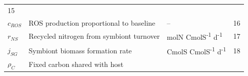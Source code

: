 \documentclass[]{elsarticle} %
\begin{document}
\begin{longtable}[c]{@{}llll@{}}
\begin{minipage}[t]{0.10\columnwidth}
15
\strut\end{minipage}\tabularnewline
\begin{minipage}[t]{0.10\columnwidth}\raggedright\strut
\(c_{ROS}\)
\strut\end{minipage} &
\begin{minipage}[t]{0.48\columnwidth}\raggedright\strut
ROS production proportional to baseline
\strut\end{minipage} &
\begin{minipage}[t]{0.25\columnwidth}\raggedright\strut
--
\strut\end{minipage} &
\begin{minipage}[t]{0.10\columnwidth}\raggedright\strut
16
\strut\end{minipage}\tabularnewline
\begin{minipage}[t]{0.10\columnwidth}\raggedright\strut
\(r_{NS}\)
\strut\end{minipage} &
\begin{minipage}[t]{0.48\columnwidth}\raggedright\strut
Recycled nitrogen from symbiont turnover
\strut\end{minipage} &
\begin{minipage}[t]{0.25\columnwidth}\raggedright\strut
molN CmolS\textsuperscript{-1} d\textsuperscript{-1}
\strut\end{minipage} &
\begin{minipage}[t]{0.10\columnwidth}\raggedright\strut
17
\strut\end{minipage}\tabularnewline
\begin{minipage}[t]{0.10\columnwidth}\raggedright\strut
\(j_{SG}\)
\strut\end{minipage} &
\begin{minipage}[t]{0.48\columnwidth}\raggedright\strut
Symbiont biomass formation rate
\strut\end{minipage} &
\begin{minipage}[t]{0.25\columnwidth}\raggedright\strut
CmolS CmolS\textsuperscript{-1} d\textsuperscript{-1}
\strut\end{minipage} &
\begin{minipage}[t]{0.10\columnwidth}\raggedright\strut
18
\strut\end{minipage}\tabularnewline
\begin{minipage}[t]{0.10\columnwidth}\raggedright\strut
\(\rho_C\)
\strut\end{minipage} &
\begin{minipage}[t]{0.48\columnwidth}\raggedright\strut
Fixed carbon shared with host
\strut\end{minipage} &

\end{longtable}
\end{document}
